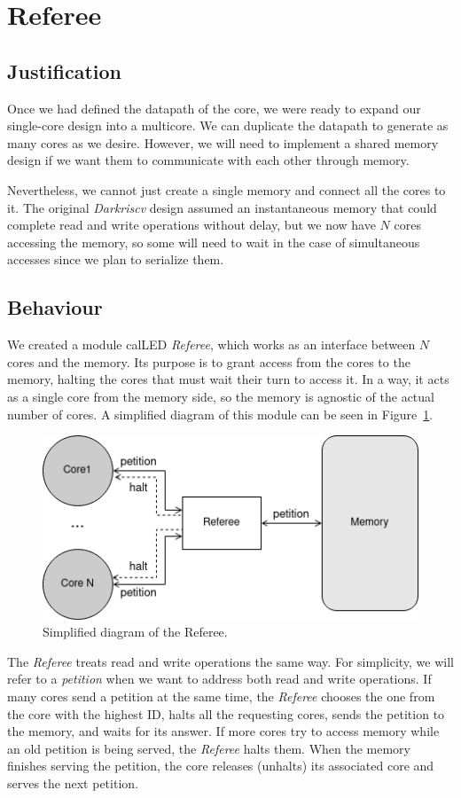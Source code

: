 \section{Referee}

\subsection{Justification} \label{referee-justification}
Once we had defined the datapath of the core, we were ready to expand our single-core design into a multicore.
We can duplicate the datapath to generate as many cores as we desire. However, we will need to implement a shared memory design if we want them to communicate with each other through memory. 

Nevertheless, we cannot just create a single memory and connect all the cores to it. 
The original \textit{Darkriscv} design assumed an instantaneous memory that could complete read and write operations without delay, but we now have $N$ cores accessing the memory, so some will need to wait in the case of simultaneous accesses since we plan to serialize them.


\subsection{Behaviour} \label{referee-behaviour}
We created a module calLED \textit{Referee}, which works as an interface between $N$ cores and the memory.
Its purpose is to grant access from the cores to the memory, halting the cores that must wait their turn to access it.
In a way, it acts as a single core from the memory side, so the memory is agnostic of the actual number of cores.
A simplified diagram of this module can be seen in Figure~\ref{referee-fig}.

\begin{figure}[h!]
    \centering
    \includegraphics[width=.5\textwidth]{images/Referee_fig.png}
    \caption{Simplified diagram of the Referee.}
    \label{referee-fig}
\end{figure}

The \textit{Referee} treats read and write operations the same way.
For simplicity, we will refer to a \textit{petition} when we want to address both read and write operations.
If many cores send a petition at the same time, the \textit{Referee} chooses the one from the core with the highest ID, halts all the requesting cores, sends the petition to the memory, and waits for its answer.
If more cores try to access memory while an old petition is being served, the \textit{Referee} halts them.
When the memory finishes serving the petition, the core releases (unhalts) its associated core and serves the next petition.


